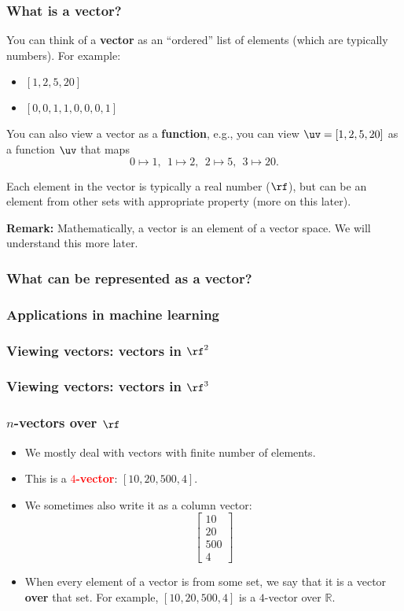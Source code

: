 

\begin{frame}\frametitle{What is a vector?}
  You can think of a {\bf vector} as an ``ordered'' list of elements (which are
  typically numbers).  For example:
  \begin{itemize}
  \item $[1,2,5,20]$
  \item $[0,0,1,1,0,0,0,1]$
  \end{itemize}

  \pause

  You can also view a vector as a {\bf function}, e.g., you can view
  $\uv = [1,2,5,20]$ as a function $\uv$ that maps
  \[
  0 \mapsto 1, \ \
  1 \mapsto 2, \ \
  2 \mapsto 5, \ \
  3 \mapsto 20.
  \]

  \pause
  
  Each element in the vector is typically a real number ($\rf$), but
  can be an element from other sets with appropriate property (more on
  this later).

  \pause

  { \tiny {\bf Remark:} Mathematically, a vector is an element of a
    vector space.  We will understand this more later.}
\end{frame}

\begin{frame}
  \frametitle{What can be represented as a vector?}
\end{frame}

\begin{frame}
  \frametitle{Applications in machine learning}
\end{frame}

\begin{frame}
  \frametitle{Viewing vectors: vectors in $\rf^2$}
\end{frame}

\begin{frame}
  \frametitle{Viewing vectors: vectors in $\rf^3$}
\end{frame}

\begin{frame}
  \frametitle{$n$-vectors over $\rf$}

  \begin{itemize}
  \item We mostly deal with vectors with finite number of elements.
  \item This is a \textcolor{red}{\bf $4$-vector}: $[10,20,500,4]$.
    \pause
  \item We sometimes also write it as a column vector:
    \[
    \begin{bmatrix}
      10 \\ 20 \\ 500 \\ 4
    \end{bmatrix}
    \]
    \pause
  \item When every element of a vector is from some set, we say that
    it is a vector {\bf over} that set.  For example, $[10,20,500,4]$
    is a $4$-vector over ${\mathbb R}$.
  \end{itemize}
\end{frame}

